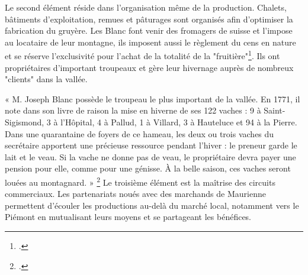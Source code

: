 \documentclass[12pt,a4paper]{report}
\begin{document}
	Le second élément réside dans l'organisation même de la production. Chalets, bâtiments d'exploitation, remues et pâturages sont organisés afin d'optimiser la fabrication du gruyère. Les Blanc font venir des fromagers de suisse et l'impose au locataire de leur montagne, ils imposent aussi le règlement  du cens en nature et se réserve l'exclusivité pour l'achat de la totalité de la "fruitière"\footcite[262]{Viallet1990Blanc}. Ils ont propriétaires d'important troupeaux et gère leur hivernage auprès de nombreux "clients" dans la vallée.
	
	« M. Joseph Blanc possède le troupeau le plus important de la vallée. En 1771, il note dans son livre de raison la mise en hiverne de ses 122 vaches : 9 à Saint-Sigismond, 3 à l'Hôpital, 4 à Pallud, 1 à Villard, 3 à Hauteluce et 94 à la Pierre. Dans une quarantaine de foyers de ce hameau, les deux ou trois vaches du secrétaire apportent une précieuse ressource pendant l'hiver : le preneur garde le lait et le veau. Si la vache ne donne pas de veau, le propriétaire devra payer une pension pour elle, comme pour une génisse. À la belle saison, ces vaches seront louées au montagnard. »
	\footcite[265]{Viallet1990Blanc}
	Le troisième élément est la maîtrise des circuits commerciaux.  Les partenariats noués avec des marchands de Maurienne permettent d'écouler les productions au-delà du marché local, notamment vers le Piémont en mutualisant leurs moyens et se partageant les bénéfices. 
	
\end{document}
